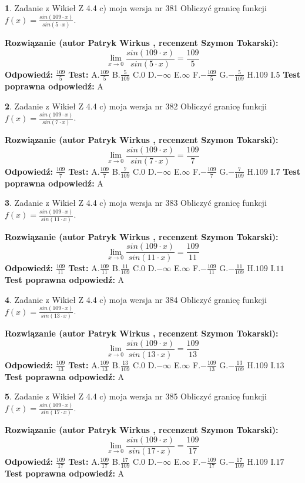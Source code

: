 \documentclass[12pt, a4paper]{article}
\theoremstyle{definition} %
\newtheorem{zad}{}
\newcommand{\zadStart}[1]{\begin{zad}#1\newline}
\newcommand{\zadStop}{\end{zad}}
\newcommand{\rozwStart}[2]{\noindent \textbf{Rozwiązanie (autor #1 , recenzent #2): }\newline}
\newcommand{\rozwStop}{\newline}
\newcommand{\odpStart}{\noindent \textbf{Odpowiedź:}\newline}
\newcommand{\odpStop}{\newline}
\newcommand{\testStart}{\noindent \textbf{Test:}\newline}
\newcommand{\testStop}{\newline}
\newcommand{\kluczStart}{\noindent \textbf{Test poprawna odpowiedź:}\newline}
\newcommand{\kluczStop}{\newline}
\begin{document}
\zadStart{Zadanie z Wikieł Z 4.4 c) moja wersja nr 381}
Obliczyć granicę funkcji $f(x)=\frac{sin(109\cdot x)}{sin(5\cdot x)}$.
\zadStop
\rozwStart{Patryk Wirkus}{Szymon Tokarski}
$$\lim\limits_{x\to 0}\frac{sin(109\cdot x)}{sin(5\cdot x)}=
\frac{109}{5}$$
\rozwStop
\odpStart
$\frac{109}{5}$
\odpStop
\testStart
A.$\frac{109}{5}$
B.$\frac{5}{109}$
C.$0$
D.$-\infty$
E.$\infty$
F.$-\frac{109}{5}$
G.$-\frac{5}{109}$
H.$109$
I.$5$
\testStop
\kluczStart
A
\kluczStop



\zadStart{Zadanie z Wikieł Z 4.4 c) moja wersja nr 382}
Obliczyć granicę funkcji $f(x)=\frac{sin(109\cdot x)}{sin(7\cdot x)}$.
\zadStop
\rozwStart{Patryk Wirkus}{Szymon Tokarski}
$$\lim\limits_{x\to 0}\frac{sin(109\cdot x)}{sin(7\cdot x)}=
\frac{109}{7}$$
\rozwStop
\odpStart
$\frac{109}{7}$
\odpStop
\testStart
A.$\frac{109}{7}$
B.$\frac{7}{109}$
C.$0$
D.$-\infty$
E.$\infty$
F.$-\frac{109}{7}$
G.$-\frac{7}{109}$
H.$109$
I.$7$
\testStop
\kluczStart
A
\kluczStop



\zadStart{Zadanie z Wikieł Z 4.4 c) moja wersja nr 383}
Obliczyć granicę funkcji $f(x)=\frac{sin(109\cdot x)}{sin(11\cdot x)}$.
\zadStop
\rozwStart{Patryk Wirkus}{Szymon Tokarski}
$$\lim\limits_{x\to 0}\frac{sin(109\cdot x)}{sin(11\cdot x)}=
\frac{109}{11}$$
\rozwStop
\odpStart
$\frac{109}{11}$
\odpStop
\testStart
A.$\frac{109}{11}$
B.$\frac{11}{109}$
C.$0$
D.$-\infty$
E.$\infty$
F.$-\frac{109}{11}$
G.$-\frac{11}{109}$
H.$109$
I.$11$
\testStop
\kluczStart
A
\kluczStop



\zadStart{Zadanie z Wikieł Z 4.4 c) moja wersja nr 384}
Obliczyć granicę funkcji $f(x)=\frac{sin(109\cdot x)}{sin(13\cdot x)}$.
\zadStop
\rozwStart{Patryk Wirkus}{Szymon Tokarski}
$$\lim\limits_{x\to 0}\frac{sin(109\cdot x)}{sin(13\cdot x)}=
\frac{109}{13}$$
\rozwStop
\odpStart
$\frac{109}{13}$
\odpStop
\testStart
A.$\frac{109}{13}$
B.$\frac{13}{109}$
C.$0$
D.$-\infty$
E.$\infty$
F.$-\frac{109}{13}$
G.$-\frac{13}{109}$
H.$109$
I.$13$
\testStop
\kluczStart
A
\kluczStop



\zadStart{Zadanie z Wikieł Z 4.4 c) moja wersja nr 385}
Obliczyć granicę funkcji $f(x)=\frac{sin(109\cdot x)}{sin(17\cdot x)}$.
\zadStop
\rozwStart{Patryk Wirkus}{Szymon Tokarski}
$$\lim\limits_{x\to 0}\frac{sin(109\cdot x)}{sin(17\cdot x)}=
\frac{109}{17}$$
\rozwStop
\odpStart
$\frac{109}{17}$
\odpStop
\testStart
A.$\frac{109}{17}$
B.$\frac{17}{109}$
C.$0$
D.$-\infty$
E.$\infty$
F.$-\frac{109}{17}$
G.$-\frac{17}{109}$
H.$109$
I.$17$
\testStop
\kluczStart
A
\kluczStop
\end{document}
